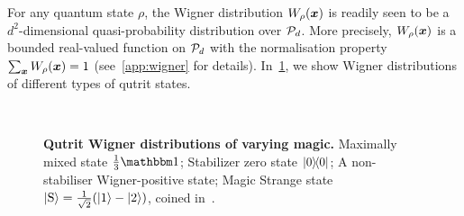 \documentclass[pra,
aps,
twocolumn,
superscriptaddress,
groupedaddress,
nofootinbib,
reprint
]{revtex4-1}
\begin{document}
For any quantum state $\rho$, the Wigner distribution $W_\rho(\bmx)$ is readily seen to be a $d^2$-dimensional quasi-probability distribution over $\cal{P}_d$. More precisely, $W_\rho(\x)$ is a bounded real-valued function on $\P_d$ with the normalisation property $\sum_{\x} W_\rho(\bmx) = 1$ (see~\cref{app:wigner} for details).  In~\cref{fig:wstate_examples}, we show Wigner distributions of different types of qutrit states.

\begin{figure}[t]
    \centering
    \hspace{8pt}%
    \\
    \hspace{8pt}%
    \caption{\textbf{Qutrit Wigner distributions of varying magic.} 
     Maximally mixed state $\frac{1}{3}\id$;  Stabilizer zero state $\ketbra{0}{0}$;  A non-stabiliser Wigner-positive state;  Magic Strange state $\ket{{\rm{S}}} = \frac{1}{\sqrt{2}}(\ket{1} - \ket{2})$, coined in~\cite{cit:veitch2}.
    }%
    \label{fig:wstate_examples}
\end{figure}
\end{document}
